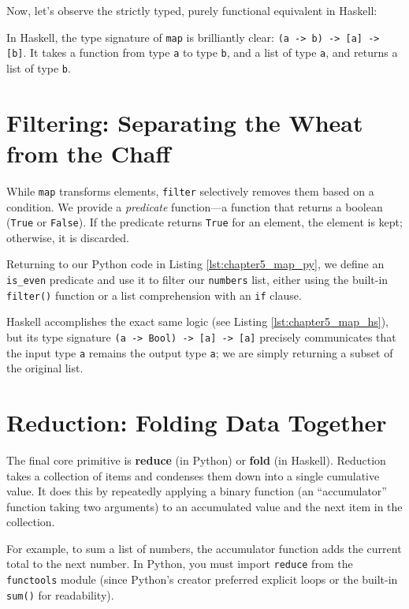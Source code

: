 Now, let's observe the strictly typed, purely functional equivalent in Haskell:



In Haskell, the type signature of \texttt{map} is brilliantly clear: \texttt{(a -> b) -> [a] -> [b]}. It takes a function from type \texttt{a} to type \texttt{b}, and a list of type \texttt{a}, and returns a list of type \texttt{b}.

\section{Filtering: Separating the Wheat from the Chaff}
While \texttt{map} transforms elements, \texttt{filter} selectively removes them based on a condition. We provide a \textit{predicate} function—a function that returns a boolean (\texttt{True} or \texttt{False}). If the predicate returns \texttt{True} for an element, the element is kept; otherwise, it is discarded.

Returning to our Python code in Listing \ref{lst:chapter5_map_py}, we define an \texttt{is\_even} predicate and use it to filter our \texttt{numbers} list, either using the built-in \texttt{filter()} function or a list comprehension with an \texttt{if} clause. 

Haskell accomplishes the exact same logic (see Listing \ref{lst:chapter5_map_hs}), but its type signature \texttt{(a -> Bool) -> [a] -> [a]} precisely communicates that the input type \texttt{a} remains the output type \texttt{a}; we are simply returning a subset of the original list.

\section{Reduction: Folding Data Together}
The final core primitive is \textbf{reduce} (in Python) or \textbf{fold} (in Haskell). Reduction takes a collection of items and condenses them down into a single cumulative value. It does this by repeatedly applying a binary function (an ``accumulator'' function taking two arguments) to an accumulated value and the next item in the collection.

For example, to sum a list of numbers, the accumulator function adds the current total to the next number. In Python, you must import \texttt{reduce} from the \texttt{functools} module (since Python's creator preferred explicit loops or the built-in \texttt{sum()} for readability).


